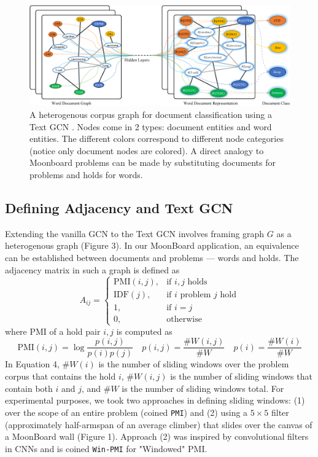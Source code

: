 \documentclass{article}
\begin{document}
\begin{figure}
\centering
\includegraphics[width=.6\linewidth]{textGCN}
\caption{A heterogenous corpus graph for document classification using a Text GCN \cite{yao2018graph}. Nodes come in 2 types: document entities and word entities. The different colors correspond to different node categories (notice only document nodes are colored). A direct analogy to Moonboard problems can be made by substituting documents for problems and holds for words.}
\label{fig: Corpus graph for Text Graph Convolutional Network}
\end{figure}

\subsection{Defining Adjacency and Text GCN}
Extending the vanilla GCN \cite{kipf2016semisupervised} to the Text GCN \cite{yao2018graph} involves framing graph $G$ as a heterogenous graph (Figure 3). In our MoonBoard application, an equivalence can be established between documents and problems --- words and holds. The adjacency matrix in such a graph is defined as
\begin{equation}
A_{ij}= 
\begin{cases}
    \text{PMI}(i, j), & \text{if } i, j \text{ holds} \\
    \text{IDF}(j), & \text{if } i \text{ problem } j \text{ hold} \\
    1, & \text{if } i=j \\
    0, & \text{otherwise}
\end{cases}
\end{equation}
where PMI of a hold pair $i, j$ is computed as
\begin{equation}
\text{PMI}(i, j) = \log\frac{p(i, j)}{p(i)p(j)}  \quad  p(i, j) = \frac{\#W(i, j)}{\#W}  \quad  p(i) = \frac{\#W(i)}{\#W}
\end{equation}
In Equation 4, $\#W(i)$ is the number of sliding windows over the problem corpus that contains the hold $i$, $\#W(i, j)$ is the number of sliding windows that contain both $i$ and $j$, and $\#W$ is the number of sliding windows total. For experimental purposes, we took two approaches in defining sliding windows: (1) over the scope of an entire problem (coined \texttt{PMI}) and (2) using a $5 \times 5$ filter (approximately half-armspan of an average climber) that slides over the canvas of a MoonBoard wall (Figure 1). Approach (2) was inspired by convolutional filters in CNNs and is coined \texttt{Win-PMI} for "Windowed" PMI.
\end{document}
